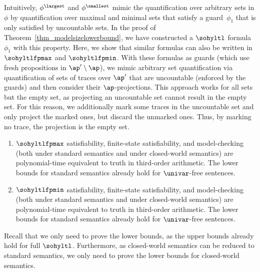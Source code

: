 Intuitively, $\phi^\largest$ and $\phi^\smallest$ mimic the quantification over arbitrary sets in $\phi$ by quantification over maximal and minimal sets that satisfy a guard~$\phi_1$ that is only satisfied by uncountable sets.
In the proof of Theorem~\ref{thm_modelsizelowerbound}, we have constructed 
a $\sohyltl$ formula~$\phi_1$ with this property. 
Here, we show that similar formulas can also be written in $\sohyltlfpmax$ and $\sohyltlfpmin$.
With these formulas as guards (which use fresh propositions in $\ap' \setminus \ap$), we mimic arbitrary set quantification via quantification of sets of traces over $\ap'$ that are uncountable (enforced by the guards) and then consider their $\ap$-projections.
This approach works for all sets but the empty set, as projecting an uncountable set cannot result in the empty set. 
For this reason, we additionally mark some traces in the uncountable set and only project the marked ones, but discard the unmarked ones.
Thus, by marking no trace, the projection is the empty set.

\begin{thm}
\label{thm_hyltlmm_complexity}
\hfill
\begin{enumerate}
    \item $\sohyltlfpmax$ satisfiability, finite-state satisfiability, and model-checking (both under standard semantics and under closed-world semantics) are polynomial-time equivalent to truth in third-order arithmetic. The lower bounds for standard semantics already hold for $\univar$-free sentences.

    \item $\sohyltlfpmin$ satisfiability, finite-state satisfiability, and model-checking (both under standard semantics and under closed-world semantics) are polynomial-time equivalent to truth in third-order arithmetic. The lower bounds for standard semantics already hold for $\univar$-free sentences.

\end{enumerate}
\end{thm}

Recall that we only need to prove the lower bounds, as the upper bounds already hold for full $\sohyltl$.
Furthermore, as closed-world semantics can be reduced to standard semantics, we only need to prove the lower bounds for closed-world semantics.

